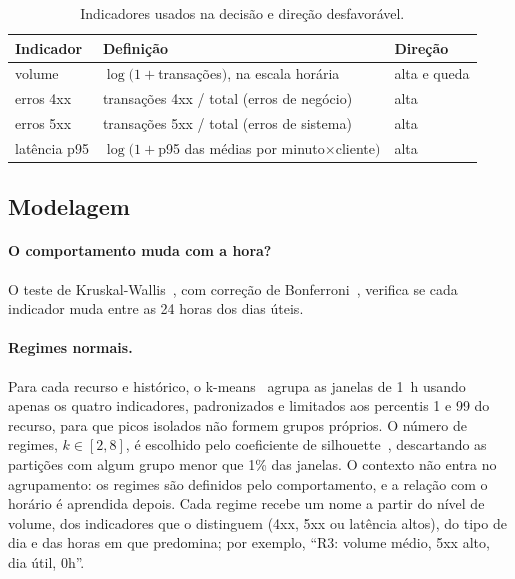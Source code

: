 \documentclass[sigconf,nonacm]{acmart}
\begin{document}
\begin{table}[t]
  \caption{Indicadores usados na decisão e direção desfavorável.}
  \label{tab:atributos}
  \small
  \begin{tabular}{p{}p{}p{}}
    \toprule
    Indicador & Definição & Direção \\
    \midrule
    volume & $\log(1+$transações$)$, na escala horária & alta e queda \\
    erros 4xx & transações 4xx / total (erros de negócio) & alta \\
    erros 5xx & transações 5xx / total (erros de sistema) & alta \\
    latência p95 & $\log(1+$p95 das médias por minuto$\times$cliente$)$ & alta \\
    \bottomrule
  \end{tabular}
\end{table}

\subsection{Modelagem}

\paragraph{O comportamento muda com a hora?} O teste de Kruskal-Wallis~\citep{kruskal1952ranks}, com correção de Bonferroni~\citep{dunn1961multiple}, verifica se cada indicador muda entre as 24 horas dos dias úteis.

\paragraph{Regimes normais.} Para cada recurso e histórico, o k-means~\citep{lloyd1982kmeans} agrupa as janelas de 1~h usando apenas os quatro indicadores, padronizados e limitados aos percentis 1 e 99 do recurso, para que picos isolados não formem grupos próprios. O número de regimes, $k\in[2,8]$, é escolhido pelo coeficiente de silhouette~\citep{rousseeuw1987silhouette}, descartando as partições com algum grupo menor que 1\% das janelas. O contexto não entra no agrupamento: os regimes são definidos pelo comportamento, e a relação com o horário é aprendida depois. Cada regime recebe um nome a partir do nível de volume, dos indicadores que o distinguem (4xx, 5xx ou latência altos), do tipo de dia e das horas em que predomina; por exemplo, ``R3: volume médio, 5xx alto, dia útil, 0h''.
\end{document}
